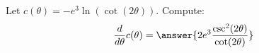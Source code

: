 \documentclass{ximera}
\begin{document}
\begin{exercise}
	Let $c(\theta) = -e^{3} \ln\left(\cot (2 \theta )\right)$. Compute:
	\[ \dd{\theta}c(\theta) =\answer{2e^{3} \frac{\csc^2( 2 \theta)}{\cot (2 \theta )}} \]
\end{exercise}
\end{document}
